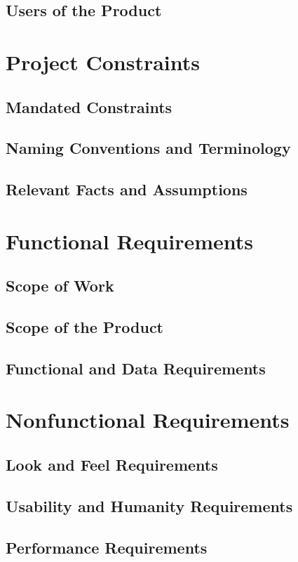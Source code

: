 \documentclass[12pt]{article}
\begin{document}
\subsection{Users of the Product}

\section{Project Constraints}
\subsection{Mandated Constraints}
\subsection{Naming Conventions and Terminology}
\subsection{Relevant Facts and Assumptions}

\section{Functional Requirements}
\subsection{Scope of Work}
\subsection{Scope of the Product}
\subsection{Functional and Data Requirements}

\section{Nonfunctional Requirements}
\subsection{Look and Feel Requirements}
\subsection{Usability and Humanity Requirements}
\subsection{Performance Requirements}
\end{document}
